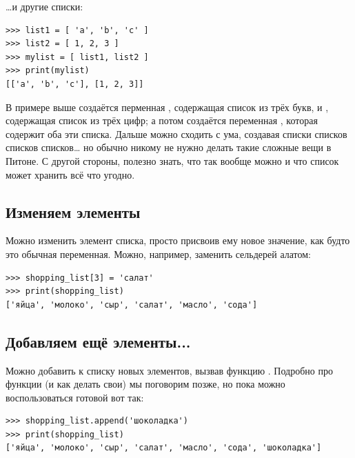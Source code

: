 …и другие списки:

\begin{listing}
\begin{verbatim}
>>> list1 = [ 'a', 'b', 'c' ]
>>> list2 = [ 1, 2, 3 ]
>>> mylist = [ list1, list2 ]
>>> print(mylist)
[['a', 'b', 'c'], [1, 2, 3]]
\end{verbatim}
\end{listing}

В примере выше создаётся перменная , содержащая список из трёх букв, и , содержащая список из трёх цифр; а потом создаётся переменная , которая содержит оба эти списка. Дальше можно сходить с ума, создавая списки списков списков списков… но обычно никому не нужно делать такие сложные вещи в Питоне. С другой стороны, полезно знать, что так вообще можно и что список может хранить всё что угодно.


\subsection*{\color{BrickRed}Изменяем элементы}

Можно изменить элемент списка, просто присвоив ему новое значение, как будто это обычная переменная. Можно, например, заменить сельдерей алатом:

\begin{listing}
\begin{verbatim}
>>> shopping_list[3] = 'салат'
>>> print(shopping_list)
['яйца', 'молоко', 'сыр', 'салат', 'масло', 'сода']
\end{verbatim}
\end{listing}

\subsection*{\color{BrickRed}Добавляем ещё элементы...}

Можно добавить к списку новых элементов, вызвав функцию . Подробно про функции (и как делать свои) мы поговорим позже, но пока можно воспользоваться готовой вот так:

\begin{listing}
\begin{verbatim}
>>> shopping_list.append('шоколадка')
>>> print(shopping_list)
['яйца', 'молоко', 'сыр', 'салат', 'масло', 'сода', 'шоколадка']
\end{verbatim}
\end{listing}

